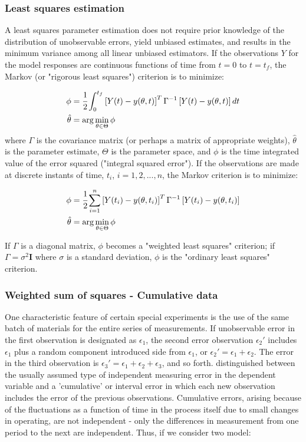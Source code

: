\documentclass[../Article_Model_Parameters.tex]{subfiles}
\begin{document}
\subsubsection{Least squares estimation}
A least squares parameter estimation does not require prior knowledge of the distribution of unobservable errors, yield  unbiased estimates, and results in the minimum variance among all linear unbiased estimators. If the observations $ Y$ for the model responses are continuous functions of time from $t = 0$ to $t = t_f$, the Markov (or "rigorous least squares") criterion is to minimize:

{\footnotesize
	\begin{align}
		\phi &= \cfrac{1}{2} \int_{0}^{t_f}  \left[ Y(t) - y(\theta,t) \right]^T \Gamma^{-1} \left[ Y(t) - y(\theta,t) \right] dt \\
		\hat{\theta} &= \arg \min_{\theta \in \Theta} \phi
\end{align} }
where $\Gamma$ is the covariance matrix (or perhaps a matrix of appropriate weights), $\hat{\theta}$ is the parameter estimate, $\Theta$ is the parameter space, and $\phi$ is the time integrated value of the error squared ("integral squared error"). 
If the observations are made at discrete instants of time, $t_i$, $i = 1,2,...,n$, the Markov criterion is to minimize:

{\footnotesize
	\begin{align}
		\phi &= \cfrac{1}{2} \sum_{i=1}^{n} \left[ Y(t_i) - y(\theta,t_i) \right]^T \Gamma^{-1} \left[ Y(t_i) - y(\theta,t_i) \right] \\
		\hat{\theta} &= \arg \min_{\theta \in \Theta} \phi
\end{align} }

If $\Gamma$ is a diagonal matrix, $\phi$  becomes a "weighted least squares" criterion; if $\Gamma = \sigma^2 \textbf{I}$ where $\sigma$ is a standard deviation, $\phi$ is the "ordinary least squares" criterion.

\iffalse
\subsubsection{Weighted sum of squares - Cumulative data}

One characteristic feature of certain special experiments is the use of the same batch of materials for the entire series of measurements. If unobservable error in the first observation is designated as $\epsilon_1$, the second error observation $\epsilon_2'$ includes $\epsilon_1$ plus a random component introduced side from $\epsilon_1$, or $\epsilon_2' = \epsilon_1 + \epsilon_2$. The error in the third observation is $\epsilon_3' = \epsilon_1 + \epsilon_2 + \epsilon_3$, and so forth. \citet{Mandel1957} distinguished between the usually assumed type of independent measuring error in the dependent variable and a 'cumulative' or interval error in which each new observation includes the error of the previous observations. Cumulative errors, arising because of the fluctuations as a function of time in the process itself due to small changes in operating, are not independent - only the differences in measurement from one period to the next are independent. Thus, if we consider two model:
\end{document}
